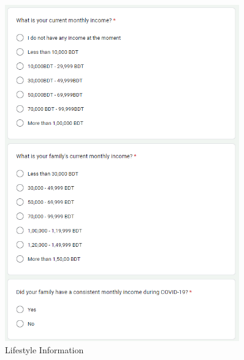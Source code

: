 \documentclass[12pt, english]{article}
\begin{document}
\begin{figure}[h]
\begin{minipage}{0.45\textwidth}
    \end{minipage}\hfill
    \begin{minipage}{0.45\textwidth}
        \centering
        \includegraphics[width=0.9\textwidth]{images/lifestyle_2.png} %
        
    \end{minipage}
    \caption{Lifestyle Information}
\end{figure}
\end{document}
